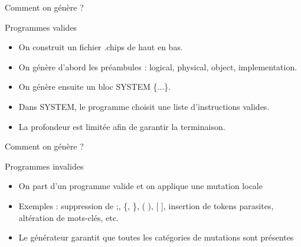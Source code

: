 \begin{frame}{Comment on génère ?}
    \begin{block}{Programmes valides}
        \begin{itemize}
            \item On construit un fichier .chips de haut en bas.
            \item On génère d’abord les préambules : logical, physical, object, implementation.
            \item On génère ensuite un bloc SYSTEM \{...\}.
            \item Dans SYSTEM, le programme choisit une liste d’instructions valides.
            \item La profondeur est limitée afin de garantir la terminaison.
        \end{itemize}
    \end{block}
\end{frame}
\begin{frame}{Comment on génère ?}
    \begin{block}{Programmes invalides}
        \begin{itemize}
            \item On part d'un programme valide et on applique une mutation locale
            \item Exemples : suppression de { ;}, {\{}, {\}}, {( )}, {[ ]}, insertion de tokens parasites, altération de mots-clés, etc.
            \item Le générateur garantit que toutes les catégories de mutations sont présentes
        \end{itemize}
    \end{block}
\end{frame}

